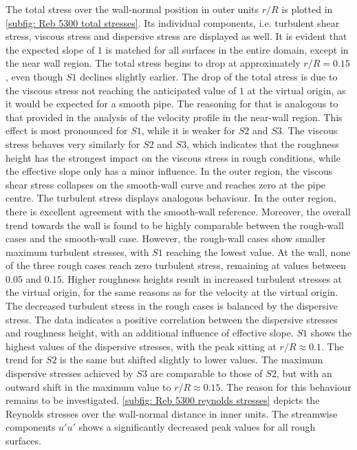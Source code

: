 The total stress over the wall-normal position in outer units $r/R$ is plotted in \autoref{subfig: Reb 5300 total stresses}.
Its individual components, i.e. turbulent shear stress, viscous stress and dispersive stress are displayed as well.
It is evident that the expected slope of $1$ is matched for all surfaces in the entire domain, except in the near wall region. 
The total stress begins to drop at approximately $r/R = 0.15$, even though $S1$ declines slightly earlier.
The drop of the total stress is due to the viscous stress not reaching the anticipated value of $1$ at the virtual origin, as it would be expected for a smooth pipe.
The reasoning for that is analogous to that provided in the analysis of the velocity profile in the near-wall region.
This effect is most pronounced for $S1$, while it is weaker for $S2$ and $S3$.
The viscous stress behaves very similarly for $S2$ and $S3$, which indicates that the roughness height has the strongest impact on the viscous stress in rough conditions, while the effective slope only has a minor influence.
In the outer region, the viscous shear stress collapses on the smooth-wall curve and reaches zero at the pipe centre.
The turbulent stress displays analogous behaviour.
In the outer region, there is excellent agreement with the smooth-wall reference.
Moreover, the overall trend towards the wall is found to be highly comparable between the rough-wall cases and the smooth-wall case.
However, the rough-wall cases show smaller maximum turbulent stresses, with $S1$ reaching the lowest value.
At the wall, none of the three rough cases reach zero turbulent stress, remaining at values between $0.05$ and $0.15$.
Higher roughness heights result in increased turbulent stresses at the virtual origin, for the same reasons as for the velocity at the virtual origin.
The decreased turbulent stress in the rough cases is balanced by the dispersive stress.
The data indicates a positive correlation between the dispersive stresses and roughness height, with an additional influence of effective slope.
$S1$ shows the highest values of the dispersive stresses, with the peak sitting at $r/R \approx 0.1$.
The trend for $S2$ is the same but shifted slightly to lower values.
The maximum dispersive stresses achieved by $S3$ are comparable to those of $S2$, but with an outward shift in the maximum value to $r/R \approx 0.15$.
The reason for this behaviour remains to be investigated.
\autoref{subfig: Reb 5300 reynolds stresses} depicts the Reynolds stresses over the wall-normal distance in inner units.
The streamwise components $u'u'$ shows a significantly decreased peak values for all rough surfaces.
